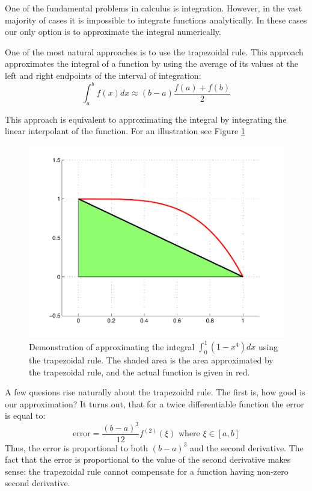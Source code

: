 

One of the fundamental problems in calculus is integration. However, in the vast majority of cases it is impossible to integrate functions analytically. In these cases our only option is to approximate the integral numerically.

One of the most natural approaches is to use the trapezoidal rule. This approach approximates the integral of a function by using the average of its values at the left and right endpoints of the interval of integration:
\[
\int_a^b f(x) dx \approx (b-a)\frac{f(a) + f(b)}{2}
\]

This approach is equivalent to approximating the integral by integrating the linear interpolant of the function. For an illustration see Figure \ref{Fig:Trapezoidal}

\begin{figure}
\begin{center}
\includegraphics[scale=.4]{./FiguresMAT/Trapezoid.pdf}
\caption{Demonstration of approximating the integral $\int_0^1 (1-x^4)dx$ using the trapezoidal rule. The shaded area is the area approximated by the trapezoidal rule, and the actual function is given in red.}
\label{Fig:Trapezoidal}
\end{center}
\end{figure}

A few quesions rise naturally about the trapezoidal rule. The first is, how good is our approximation? It turns out, that for a twice differentiable function the error is equal to:
\[
\mbox{error} = \frac{(b-a)^3}{12}f^{(2)}(\xi) \mbox{ where } \xi \in [a,b]
\]
Thus, the error is proportional to both $(b-a)^3$ and the second derivative. The fact that the error is proportional to the value of the second derivative makes sense: the trapezoidal rule cannot compensate for a function having non-zero second derivative.

